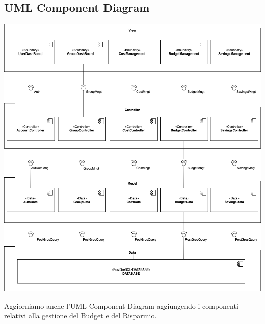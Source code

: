 \subsection{UML Component Diagram}

\begin{center}
    \includegraphics[scale=0.4]{images/ComponentDiagramV1.4.png}
\end{center}

Aggiorniamo anche l'UML Component Diagram aggiungendo i componenti relativi alla gestione del Budget e del Risparmio. 
